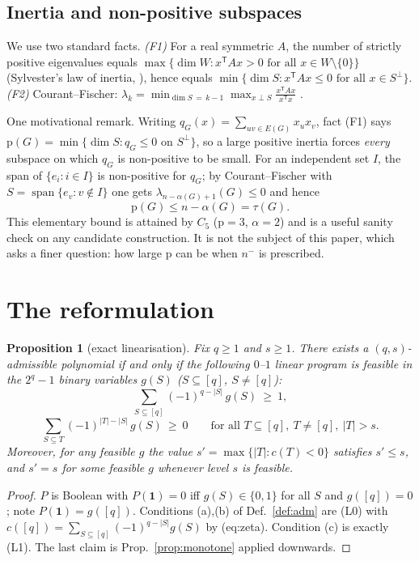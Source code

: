 \documentclass[11pt,a4paper]{article}
\theoremstyle{plain}
\newtheorem{proposition}[theorem]{Proposition}
\theoremstyle{definition}
\newcommand{\pp}{\mathrm{p}}
\begin{document}
\subsection{Inertia and non-positive subspaces}
\label{sec:dictionary}

We use two standard facts.  \emph{(F1)} For a real symmetric $A$, the number of strictly
positive eigenvalues equals $\max\{\dim W: x^{\mathsf T}Ax>0 \text{ for all } x\in
W\setminus\{0\}\}$ (Sylvester's law of inertia, \cite{HardyLittlewoodPolya1952}), hence
equals $\min\{\dim S: x^{\mathsf T}Ax\le 0 \text{ for all } x\in S^\perp\}$.
\emph{(F2)} Courant--Fischer: $\lambda_k=\min_{\dim S\,=\,k-1}\max_{x\perp S}
\frac{x^{\mathsf T}Ax}{x^{\mathsf T}x}$ \cite{CourantFischer1927,Hoffman1947}.

One motivational remark.  Writing $q_G(x)=\sum_{uv\in E(G)}x_ux_v$, fact (F1) says
$\pp(G)=\min\{\dim S: q_G\le 0 \text{ on } S^\perp\}$, so a large positive inertia forces
\emph{every} subspace on which $q_G$ is non-positive to be small.  For an independent set
$I$, the span of $\{e_i: i\in I\}$ is non-positive for $q_G$; by Courant--Fischer with
$S=\operatorname{span}\{e_v: v\notin I\}$ one gets $\lambda_{n-\alpha(G)+1}(G)\le 0$
and hence
\[
\pp(G)\le n-\alpha(G)=\tau(G). \tag{1}
\]
This elementary bound is attained by $C_5$ ($\pp=3$, $\alpha=2$) and is a useful sanity
check on any candidate construction.  It is not the subject of this paper, which asks a
finer question: how large $\pp$ can be when $n^-$ is prescribed.

\section{The reformulation}
\label{sec:ref}

\begin{proposition}[exact linearisation]
\label{prop:ref}
Fix $q\ge 1$ and $s\ge 1$.  There exists a $(q,s)$-admissible polynomial if and only if
the following $0$--$1$ linear program is feasible in the $2^q-1$ binary variables
$g(S)$ ($S\subseteq[q]$, $S\neq[q]$):
\[
\sum_{S\subseteq[q]}(-1)^{q-|S|}\,g(S)\ \ge\ 1, \tag{L0}
\]
\[
\sum_{S\subseteq T}(-1)^{|T|-|S|}\,g(S)\ \ge\ 0
\qquad\text{for all }T\subseteq[q],\ T\neq[q],\ |T|>s. \tag{L1}
\]
Moreover, for any feasible $g$ the value $s'=\max\{|T|: c(T)<0\}$ satisfies $s'\le s$,
and $s'=s$ for some feasible $g$ whenever level $s$ is feasible.
\end{proposition}

\begin{proof}
$P$ is Boolean with $P(\mathbf 1)=0$ iff $g(S)\in\{0,1\}$ for all $S$ and
$g([q])=0$; note $P(\mathbf 1)=g([q])$.  Conditions (a),(b) of
\textup{Def.~\ref{def:adm}} are (L0) with $c([q])=\sum_{S\subseteq[q]}(-1)^{q-|S|}g(S)$
by \textup{(eq:zeta)}.  Condition (c) is exactly (L1).  The last claim is
Prop.~\ref{prop:monotone} applied downwards.
\end{proof}
\end{document}
